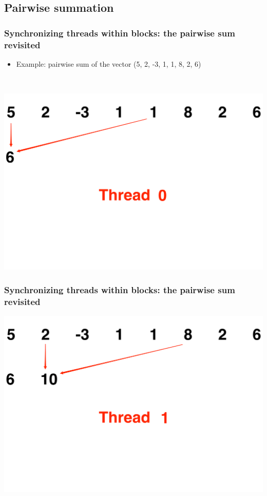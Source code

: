 \documentclass[handout]{beamer}
\providecommand{\q}{$\quad$ \newline}
\numberwithin{equation}{section}
\begin{document}
\subsection{Pairwise summation}

\begin{frame}
\frametitle{Synchronizing threads within blocks: the pairwise sum revisited}
\begin{itemize}
\pause \item Example: pairwise sum of the vector (5, 2, -3, 1, 1, 8, 2, 6) 
\end{itemize} \q
\pause \begin{center}
\includegraphics[scale = .15]{../../fig/psum1}
\end{center}
\end{frame}

\begin{frame}
\frametitle{Synchronizing threads within blocks: the pairwise sum revisited}
\begin{center}
\includegraphics[scale = .15]{../../fig/psum2}
\end{center}
\end{frame}
\end{document}
